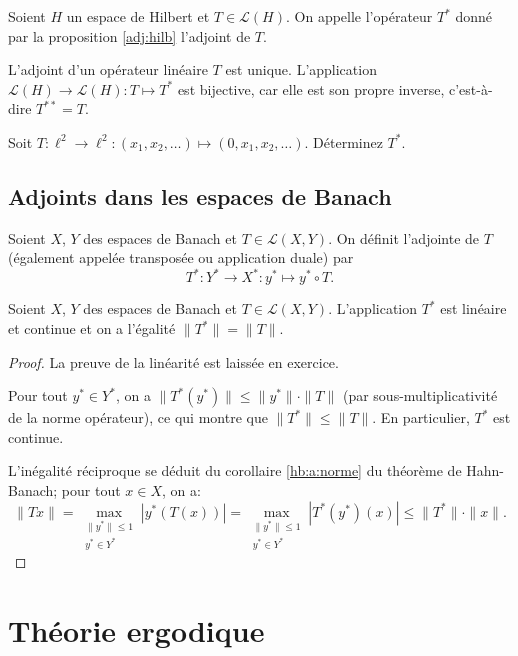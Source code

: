 \begin{df}
  Soient $H$ un espace de Hilbert et $T\in\mathcal L(H)$. On appelle l'opérateur
  $T^*$ donné par la proposition \ref{adj:hilb} l'adjoint de $T$.
\end{df}

\begin{rem}
  L'adjoint d'un opérateur linéaire $T$ est unique. L'application
  $\mathcal L(H)\to\mathcal L(H): T\mapsto T^*$ est bijective, car elle
  est son propre inverse, c'est-à-dire $T^{**} = T$.
\end{rem}

\begin{exo}
  Soit $T: \ell^2\to \ell^2: (x_1, x_2, \ldots)\mapsto (0, x_1, x_2, \ldots)$.
  Déterminez $T^*$.
\end{exo}
\subsection{Adjoints dans les espaces de Banach}
\begin{df}
  Soient $X$, $Y$ des espaces de Banach et $T\in \mathcal L(X, Y)$.
  On définit l'adjointe de $T$ (également appelée transposée ou application
  duale) par $$T^*: Y^*\to X^*: y^*\mapsto y^*\circ T.$$
\end{df}

\begin{prop}
  Soient $X$, $Y$ des espaces de Banach et $T\in \mathcal L(X, Y)$.
  L'application $T^*$ est linéaire et continue et on a l'égalité
  $\|T^*\| = \|T\|$.
\end{prop}
\begin{proof}
  La preuve de la linéarité est laissée en exercice.

  Pour tout $y^*\in Y^*$, on a $\|T^*(y^*)\| \leq \|y^*\| \cdot \|T\|$ (par
  sous-multiplicativité de la norme opérateur), ce qui montre que
  $\|T^*\| \leq \|T\|$. En particulier, $T^*$ est continue.

  L'inégalité réciproque se déduit du corollaire \ref{hb:a:norme} du théorème
  de Hahn-Banach; pour tout $x\in X$, on a:
  $$\|Tx\| = \max_{\substack{\|y^*\|\leq 1 \\ y^*\in Y^*}}|y^*(T(x))|
  =\max_{\substack{\|y^*\|\leq 1 \\ y^*\in Y^*}}|T^*(y^*)(x)|
  \leq \|T^*\|\cdot \|x\|.$$
\end{proof}
\section{Théorie ergodique}
